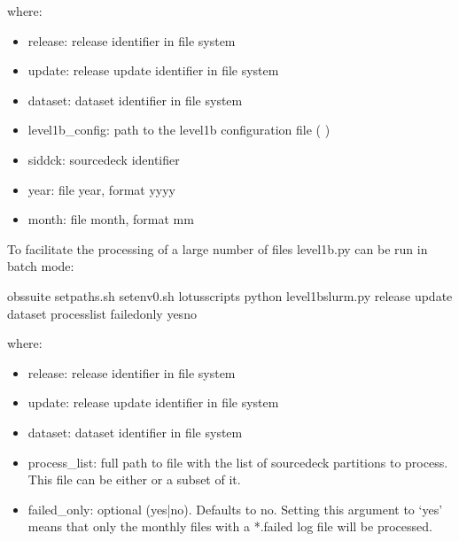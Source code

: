 \documentclass[letterpaper,10pt,english]{sphinxmanual}
\begin{document}
where:
\begin{itemize}
\item {}
release: release identifier in file system

\item {}
update: release update identifier in file system

\item {}
dataset: dataset identifier in file system

\item {}
level1b\_config: path to the level1b configuration file ( {\hyperref[\detokenize{index:level1b-config-file}]{}})

\item {}
sid\sphinxhyphen{}dck: source\sphinxhyphen{}deck identifier

\item {}
year: file year, format yyyy

\item {}
month: file month, format mm

\end{itemize}

To facilitate the processing of a large number of files level1b.py can be run
in batch mode:

\begin{sphinxVerbatim}[commandchars=\\\{\}]
 obs\PYGZhy{}suite
 setpaths.sh
 setenv0.sh
 lotus\PYGZus{}scripts
python level1b\PYGZus{}slurm.py release update dataset  process\PYGZus{}list \PYGZhy{}\PYGZhy{}failed\PYGZus{}only yesno
\end{sphinxVerbatim}

where:
\begin{itemize}
\item {}
release: release identifier in file system

\item {}
update: release update identifier in file system

\item {}
dataset: dataset identifier in file system

\item {}
process\_list: full path to file with the list of source\sphinxhyphen{}deck partitions to
process. This file can be either {\hyperref[\detokenize{index:process-list-file}]{}} or a subset of it.

\item {}
failed\_only: optional (yes|no). Defaults to no. Setting this argument to ‘yes’
means that only the monthly files with a *.failed log file will be processed.

\end{itemize}
\end{document}
